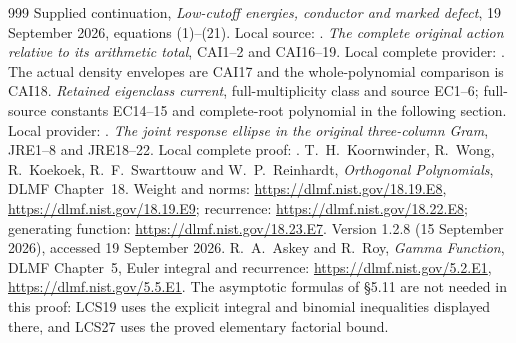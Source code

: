 \documentclass[11pt,a4paper]{article}
\begin{document}
\begin{thebibliography}{999}
 Supplied continuation,
\emph{Low-cutoff energies, conductor and marked defect},
19 September 2026, equations (1)--(21).
Local source: .
 \emph{The complete original action relative to its
arithmetic total}, CAI1--2 and CAI16--19. Local complete provider:
.
The actual density envelopes are CAI17 and the whole-polynomial
comparison is CAI18.
 \emph{Retained eigenclass current}, full-multiplicity
class and source EC1--6; full-source constants EC14--15 and
complete-root polynomial in the following section. Local provider:
.
 \emph{The joint response ellipse in the original
three-column Gram}, JRE1--8 and JRE18--22. Local complete proof:
.
 T.~H.~Koornwinder, R.~Wong, R.~Koekoek,
R.~F.~Swarttouw and W.~P.~Reinhardt,
\emph{Orthogonal Polynomials}, DLMF Chapter~18.
Weight and norms: \url{https://dlmf.nist.gov/18.19.E8},
\url{https://dlmf.nist.gov/18.19.E9}; recurrence:
\url{https://dlmf.nist.gov/18.22.E8}; generating function:
\url{https://dlmf.nist.gov/18.23.E7}.
Version 1.2.8 (15 September 2026), accessed 19 September 2026.
 R.~A.~Askey and R.~Roy,
\emph{Gamma Function}, DLMF Chapter~5, Euler integral and recurrence:
\url{https://dlmf.nist.gov/5.2.E1},
\url{https://dlmf.nist.gov/5.5.E1}.
The asymptotic formulas of \S5.11 are not needed in this proof:
LCS19 uses the explicit integral and binomial inequalities displayed
there, and LCS27 uses the proved elementary factorial bound.


\end{thebibliography}
\end{document}

